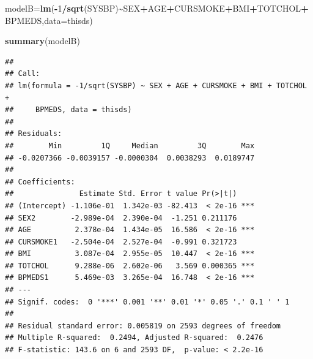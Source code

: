 \documentclass[
  10pt,
  ignorenonframetext,
]{beamer}
\newenvironment{Shaded}{\begin{snugshade}}{\end{snugshade}}
\newcommand{\AttributeTok}[1]{\textcolor[rgb]{0.13,0.29,0.53}{#1}}
\newcommand{\DecValTok}[1]{\textcolor[rgb]{0.00,0.00,0.81}{#1}}
\newcommand{\FunctionTok}[1]{\textcolor[rgb]{0.13,0.29,0.53}{\textbf{#1}}}
\newcommand{\NormalTok}[1]{#1}
\newcommand{\OtherTok}[1]{\textcolor[rgb]{0.56,0.35,0.01}{#1}}
\newcommand{\SpecialCharTok}[1]{\textcolor[rgb]{0.81,0.36,0.00}{\textbf{#1}}}
\begin{document}
\begin{frame}[fragile]
\scriptsize

\begin{Shaded}
\begin{Highlighting}[]
\NormalTok{modelB}\OtherTok{=}\FunctionTok{lm}\NormalTok{(}\SpecialCharTok{{-}}\DecValTok{1}\SpecialCharTok{/}\FunctionTok{sqrt}\NormalTok{(SYSBP)}\SpecialCharTok{\textasciitilde{}}\NormalTok{SEX}\SpecialCharTok{+}\NormalTok{AGE}\SpecialCharTok{+}\NormalTok{CURSMOKE}\SpecialCharTok{+}\NormalTok{BMI}\SpecialCharTok{+}\NormalTok{TOTCHOL}\SpecialCharTok{+}\NormalTok{BPMEDS,}\AttributeTok{data=}\NormalTok{thisds)}

\FunctionTok{summary}\NormalTok{(modelB)}
\end{Highlighting}
\end{Shaded}

\begin{verbatim}
## 
## Call:
## lm(formula = -1/sqrt(SYSBP) ~ SEX + AGE + CURSMOKE + BMI + TOTCHOL + 
##     BPMEDS, data = thisds)
## 
## Residuals:
##        Min         1Q     Median         3Q        Max 
## -0.0207366 -0.0039157 -0.0000304  0.0038293  0.0189747 
## 
## Coefficients:
##               Estimate Std. Error t value Pr(>|t|)    
## (Intercept) -1.106e-01  1.342e-03 -82.413  < 2e-16 ***
## SEX2        -2.989e-04  2.390e-04  -1.251 0.211176    
## AGE          2.378e-04  1.434e-05  16.586  < 2e-16 ***
## CURSMOKE1   -2.504e-04  2.527e-04  -0.991 0.321723    
## BMI          3.087e-04  2.955e-05  10.447  < 2e-16 ***
## TOTCHOL      9.288e-06  2.602e-06   3.569 0.000365 ***
## BPMEDS1      5.469e-03  3.265e-04  16.748  < 2e-16 ***
## ---
## Signif. codes:  0 '***' 0.001 '**' 0.01 '*' 0.05 '.' 0.1 ' ' 1
## 
## Residual standard error: 0.005819 on 2593 degrees of freedom
## Multiple R-squared:  0.2494, Adjusted R-squared:  0.2476 
## F-statistic: 143.6 on 6 and 2593 DF,  p-value: < 2.2e-16
\end{verbatim}

\normalsize
\end{frame}
\end{document}
